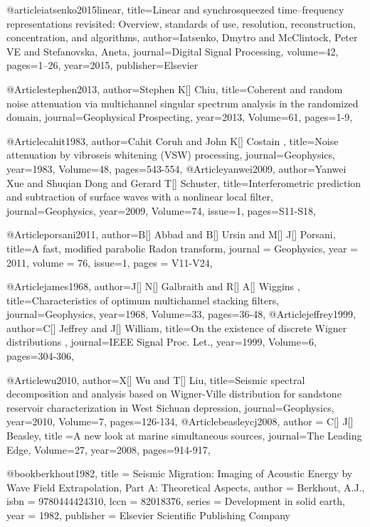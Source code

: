 @article{iatsenko2015linear,
  title={Linear and synchrosqueezed time--frequency representations revisited: Overview, standards of use, resolution, reconstruction, concentration, and algorithms},
  author={Iatsenko, Dmytro and McClintock, Peter VE and Stefanovska, Aneta},
  journal={Digital Signal Processing},
  volume={42},
  pages={1--26},
  year={2015},
  publisher={Elsevier}
}


@Article{stephen2013,
  author={Stephen K[] Chiu},
  title={Coherent and random noise attenuation via multichannel singular spectrum analysis in the randomized domain},
  journal={Geophysical Prospecting},
  year=2013,
  Volume=61,
  pages={1-9},
}


@Article{cahit1983,
  author={Cahit Coruh and John K[] Costain },
  title={Noise attenuation by vibroseis whitening (VSW) processing},
  journal={Geophysics},
  year=1983,
  Volume=48,
  pages={543-554},
}
@Article{yanwei2009,
  author={Yanwei Xue and Shuqian Dong and Gerard T[] Schuster},
  title={Interferometric prediction and subtraction of surface waves with a nonlinear local filter},
  journal={Geophysics},
  year=2009,
  Volume=74,
  issue=1,
  pages={S11-S18},
}





@Article{porsani2011,
  author={B[] Abbad and B[] Ursin and M[] J[] Porsani},
  title={A fast, modified parabolic Radon transform},
  journal = 	 {Geophysics},
  year = 	 2011,
  volume =	 76,
  issue=1,
  pages =	 {V11-V24},
}



@Article{james1968,
  author={J[] N[] Galbraith and R[] A[] Wiggins },
  title={Characteristics of optimum multichannel stacking filters},
  journal={Geophysics},
  year=1968,
  Volume=33,
  pages={36-48},
}
@Article{jeffrey1999,
  author={C[] Jeffrey and J[] William},
  title={On the existence of discrete Wigner distributions
},
  journal={IEEE Signal Proc. Let.},
  year=1999,
  Volume=6,
  pages={304-306},
}

@Article{wu2010,
  author={X[] Wu and T[] Liu},
  title={Seismic spectral decomposition and analysis based on Wigner-Ville distribution for sandstone reservoir characterization in West Sichuan depression},
  journal={Geophysics},
  year=2010,
  Volume=7,
  pages={126-134},
}
@Article{beasleycj2008,
  author = {C[] J[] Beasley},
  title ={A new look at marine simultaneous sources},
  journal={The Leading Edge},
  Volume=27,
  year=2008,
  pages={914-917},
}

@book{berkhout1982,
title     = {Seismic Migration: Imaging of Acoustic Energy by Wave Field Extrapolation, Part A: Theoretical Aspects},
author    = {Berkhout, A.J.},
isbn      = {9780444424310},
lccn      = {82018376},
series    = {Development in solid earth},
year      = {1982},
publisher = {Elsevier Scientific Publishing Company}
}


